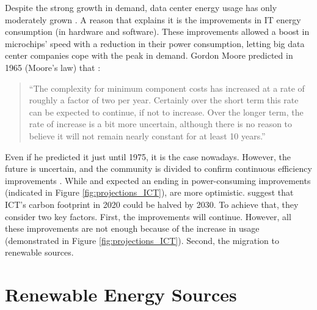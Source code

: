 Despite the strong growth in demand, data center energy usage has only moderately grown \cite{centres2022data}. A reason that explains it is the improvements in IT energy consumption (in hardware and software). These improvements allowed a boost in microchips' speed with a reduction in their power consumption, letting big data center companies cope with the peak in demand. Gordon Moore predicted in 1965 (Moore's law) that \cite{moore1965cramming}:

\begin{quote}
    ``The complexity for minimum component costs has increased at a rate of roughly a factor of two per year. Certainly over the short term this rate can be expected to continue, if not to increase. Over the longer term, the rate of increase is a bit more uncertain, although there is no reason to believe it will not remain nearly constant for at least 10 years.''
\end{quote}

Even if he predicted it just until 1975, it is the case nowadays. However, the future is uncertain, and the community is divided to confirm continuous efficiency improvements \cite{freitag2021climate}. While \citeauthor{andrae2015global} \cite{andrae2015global} and \citeauthor{belkhir2018assessing} \cite{belkhir2018assessing} expected an ending in power-consuming improvements (indicated in Figure \ref{fig:projections_ICT}), \citeauthor{malmodin2018energy} \cite{malmodin2018energy} are more optimistic. \citeauthor{malmodin2018energy} suggest that ICT’s carbon footprint in 2020 could be halved by 2030. To achieve that, they consider two key factors. First, the improvements will continue. However, all these improvements are not enough because of the increase in usage (demonstrated in Figure \ref{fig:projections_ICT}). Second, the migration to renewable sources.


\section{Renewable Energy Sources}

